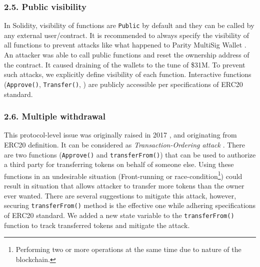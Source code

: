 \subsubsection*{2.5. Public visibility}
In Solidity, visibility of functions are \texttt{Public} by default and they can be called by any external user/contract. It is recommended to always specify the visibility of all functions to prevent attacks like what happened to Parity MultiSig Wallet \cite{ParityFirstHack}. An attacker was able to call public functions and reset the ownership address of the contract. It caused draining of the wallets to the tune of \$31M. To prevent such attacks, we explicitly define visibility of each function. Interactive functions (\eg \texttt{Approve()}, \texttt{Transfer()}, \etc) are publicly accessible per specifications of ERC20 standard.

\subsubsection*{2.6. Multiple withdrawal}
This protocol-level issue was originally raised in 2017 \cite{MikVlad}, \cite{TomHale} and originating from ERC20 definition. It can be considered as \textit{Transaction-Ordering attack} \cite{OrderingAttack}. There are two functions (\ie \texttt{Approve()} and \texttt{transferFrom()}) that can be used to authorize a third party for transferring tokens on behalf of someone else. Using these functions  in an undesirable situation (\ie Front-running\cite{eskandari2019sok} or race-condition\footnote{Performing two or more operations at the same time due to nature of the blockchain.}) could result in situation that allows attacker to transfer more tokens than the owner ever wanted. There are several suggestions to mitigate this attack, however, securing \texttt{transferFrom()} method is the effective one while adhering specifications of ERC20 standard\cite{ERC20MWA}. We added a new state variable to the \texttt{transferFrom()} function to track transferred tokens and mitigate the attack. 

